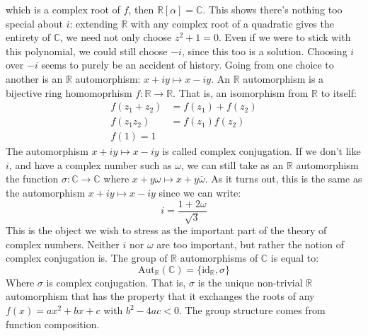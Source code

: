 \documentclass{article}                                                        %
\begin{document}
            which is a complex root of $f$, then
            $\mathbb{R}[\alpha]=\mathbb{C}$. This shows there's nothing too
            special about $i$: extending $\mathbb{R}$ with any complex root of
            a quadratic gives the entirety of $\mathbb{C}$, we need not only
            choose $z^{2}+1=0$. Even if we were to stick with this polynomial,
            we could still choose $\minus{i}$, since this too is a solution.
            Choosing $i$ over $\minus{i}$ seems to purely be an accident of
            history. Going from one choice to another is an
            $\mathbb{R}$ automorphism: $x+iy\mapsto{x}-iy$. An $\mathbb{R}$
            automorphism is a bijective ring homomoprhism
            $f:\mathbb{R}\rightarrow\mathbb{R}$. That is, an isomorphism from
            $\mathbb{R}$ to itself:
            \begin{align}
                f(z_{1}+z_{2})&=f(z_{1})+f(z_{2})\\
                f(z_{1}z_{2})&=f(z_{1})f(z_{2})\\
                f(1)=1
            \end{align}
            The automorphism $x+iy\mapsto{x}-iy$ is called complex conjugation.
            If we don't like $i$, and have a complex number such as $\omega$,
            we can still take as an $\mathbb{R}$ automorphism the function
            $\sigma:\mathbb{C}\rightarrow\mathbb{C}$ where
            $x+y\omega\mapsto{x}+y\overline{\omega}$. As it turns out, this is
            the same as the automorphism $x+iy\mapsto{x}-iy$ since we can write:
            \begin{equation}
                i=\frac{1+2\omega}{\sqrt{3}}
            \end{equation}
            This is the object we wish to stress as the important part of the
            theory of complex numbers. Neither $i$ nor $\omega$ are too
            important, but rather the notion of complex conjugation is.
            The group of $\mathbb{R}$ automorphisms of $\mathbb{C}$ is equal to:
            \begin{equation}
                \textrm{Aut}_{\mathbb{R}}(\mathbb{C})
                    =\{\textrm{id}_{\mathbb{R}},\sigma\}
            \end{equation}
            Where $\sigma$ is complex conjugation. That is, $\sigma$ is the
            unique non-trivial $\mathbb{R}$ automorphism that has the property
            that it exchanges the roots of any $f(x)=ax^{2}+bx+c$ with
            $b^{2}-4ac<0$. The group structure comes from function composition.
\end{document}
